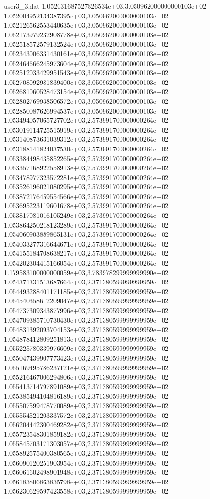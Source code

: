 \begin{filecontents}{user3_3.dat}
1.052031687527826534e+03,3.050962000000000103e+02
1.052004952134387395e+03,3.050962000000000103e+02
1.052126562553440635e+03,3.050962000000000103e+02
1.052173979232908778e+03,3.050962000000000103e+02
1.052518572579132524e+03,3.050962000000000103e+02
1.052343006331430161e+03,3.050962000000000103e+02
1.052464666245973604e+03,3.050962000000000103e+02
1.052512033429951543e+03,3.050962000000000103e+02
1.052708092981839400e+03,3.050962000000000103e+02
1.052681060528473154e+03,3.050962000000000103e+02
1.052802769938506572e+03,3.050962000000000103e+02
1.052850087626994537e+03,3.050962000000000103e+02
1.053494057065727702e+03,2.573991700000000264e+02
1.053019114725515919e+03,2.573991700000000264e+02
1.053140873631039312e+03,2.573991700000000264e+02
1.053188141824037530e+03,2.573991700000000264e+02
1.053384498435852265e+03,2.573991700000000264e+02
1.053357168922558913e+03,2.573991700000000264e+02
1.053478977323572281e+03,2.573991700000000264e+02
1.053526196021080295e+03,2.573991700000000264e+02
1.053872176459554566e+03,2.573991700000000264e+02
1.053695223119601678e+03,2.573991700000000264e+02
1.053817081016105249e+03,2.573991700000000264e+02
1.053864250218123289e+03,2.573991700000000264e+02
1.054060903889865131e+03,2.573991700000000264e+02
1.054033277316644671e+03,2.573991700000000264e+02
1.054155184708638217e+03,2.573991700000000264e+02
1.054202304415166054e+03,2.573991700000000264e+02
1.179583100000000059e+03,3.783978299999999990e+02
1.054371331513687664e+03,2.371380599999999959e+02
1.054493288401171185e+03,2.371380599999999959e+02
1.054540358612209047e+03,2.371380599999999959e+02
1.054737309343877996e+03,2.371380599999999959e+02
1.054709385710730430e+03,2.371380599999999959e+02
1.054831392093704153e+03,2.371380599999999959e+02
1.054878412809251813e+03,2.371380599999999959e+02
1.055225780339976609e+03,2.371380599999999959e+02
1.055047439907773423e+03,2.371380599999999959e+02
1.055169495786237121e+03,2.371380599999999959e+02
1.055216467006294806e+03,2.371380599999999959e+02
1.055413714797891089e+03,2.371380599999999959e+02
1.055385494104816189e+03,2.371380599999999959e+02
1.055507599478770089e+03,2.371380599999999959e+02
1.055554521203337572e+03,2.371380599999999959e+02
1.056204442300469282e+03,2.371380599999999959e+02
1.055723548301859182e+03,2.371380599999999959e+02
1.055845703171303057e+03,2.371380599999999959e+02
1.055892575400380565e+03,2.371380599999999959e+02
1.056090120251903954e+03,2.371380599999999959e+02
1.056061602498901948e+03,2.371380599999999959e+02
1.056183806863835798e+03,2.371380599999999959e+02
1.056230629597423558e+03,2.371380599999999959e+02

\end{filecontents}
